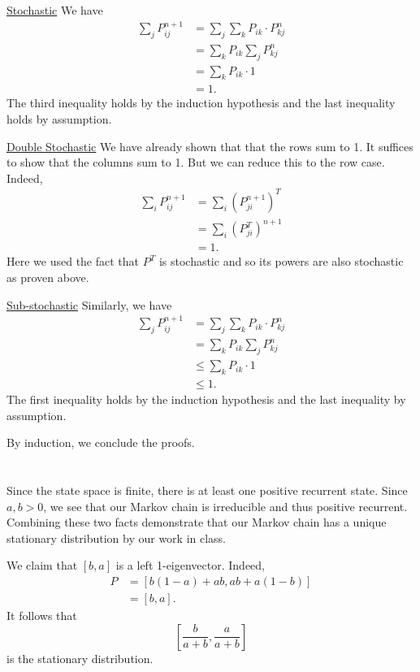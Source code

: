 \documentclass[10pt]{article}
\begin{document}
\underline{Stochastic}
We have
\begin{align*}
  \sum_j P_{ij}^{n+1}
  &= \sum_j \sum_k P_{ik}\cdot P_{kj}^n \\
  &= \sum_k P_{ik} \sum_j P_{kj}^n \\
  &= \sum_k P_{ik}\cdot 1 \\
  &= 1.
\end{align*}
The third inequality holds by the induction hypothesis
and the last inequality holds by assumption.

\underline{Double Stochastic}
We have already shown that that the rows sum to 1.
It suffices to show that the columns sum to 1.
But we can reduce this to the row case.
Indeed,
\begin{align*}
  \sum_i P_{ij}^{n+1}
  &= \sum_i (P_{ji}^{n+1})^T \\
  &= \sum_i (P_{ji}^T)^{n+1} \\
  &= 1.
\end{align*}
Here we used the fact that $P^T$ is stochastic
and so its powers are also stochastic
as proven above.

\underline{Sub-stochastic}
Similarly,
we have
\begin{align*}
  \sum_j P_{ij}^{n+1}
  &= \sum_j \sum_k P_{ik}\cdot P_{kj}^n \\
  &= \sum_k P_{ik} \sum_j P_{kj}^n \\
  &\leq \sum_k P_{ik}\cdot 1 \\
  &\leq 1.
\end{align*}
The first inequality holds by the induction hypothesis
and the last inequality by assumption.

By induction,
we conclude the proofs.

\clearpage
\section{}
\subsection{}
Since the state space is finite,
there is at least one positive recurrent state.
Since $a, b> 0$,
we see that our Markov chain is irreducible and thus positive recurrent.
Combining these two facts demonstrate that our Markov chain has a unique stationary distribution
by our work in class.

We claim that $[b, a]$ is a left 1-eigenvector.
Indeed,
\begin{align*}
  [b, a] P
  &= [b(1-a) + ab, ab + a(1-b)] \\
  &= [b, a].
\end{align*}
It follows that
\[
  \left[ \frac{b}{a+b}, \frac{a}{a+b} \right]
\]
is the stationary distribution.
\end{document}
